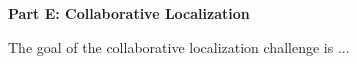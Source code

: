 \clearpage
\sffamily
{\bfseries\color[rgb]{0.4,0.4,0.4} Part E: Collaborative Localization}
{}


\bigskip

The goal of the collaborative localization challenge is ...
